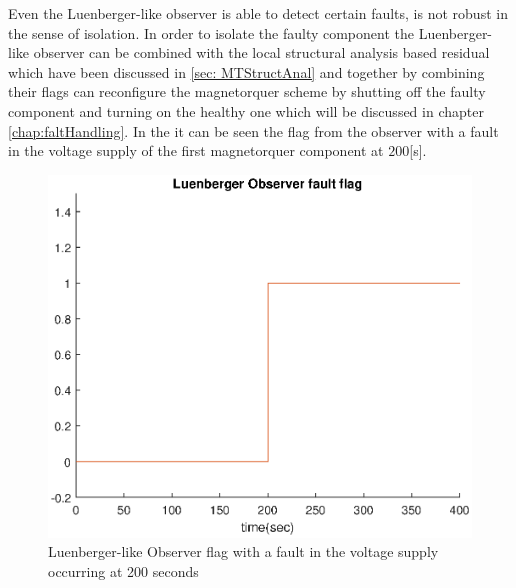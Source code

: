 %
 Even the Luenberger-like observer is able to detect certain faults, is not robust in the sense of isolation. In order to isolate the faulty component the  Luenberger-like observer can be combined with the local structural analysis based residual which have been discussed in \ref{sec: MTStructAnal} and together by combining their flags can reconfigure the magnetorquer scheme by shutting off the faulty component and turning on the healthy one which will be discussed in chapter \ref{chap:faltHandling}. In the  it can be seen the flag from the observer with a fault in the voltage supply of the first magnetorquer component at $200$[s]. 
 \begin{figure}[H]
 	\centering
 	\includegraphics[width=0.9\linewidth]{figures/Luenberger_Observerflag}
 	\caption{Luenberger-like Observer flag with a fault in the voltage supply occurring at 200 seconds   }
 	\label{fig:obsflag}
 \end{figure}

%